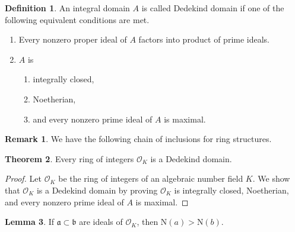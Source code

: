\documentclass[a4paper]{book}
\theoremstyle{definition}
\newtheorem{definition}{Definition}[]
\newtheorem{theorem}[definition]{Theorem}
\newtheorem{lemma}[definition]{Lemma}
\newtheorem*{remark}{Remark}
\begin{document}
\begin{defbox}
    \begin{definition}
        An integral domain \(A\) is called Dedekind domain if one of the following equivalent conditions are met.
        \begin{enumerate}
            \item Every nonzero proper ideal of \(A\) factors into product of prime ideals.
            \item \(A\) is
            \begin{enumerate}
                \item integrally closed,
                \item Noetherian,
                \item and every nonzero prime ideal of \(A\) is maximal.
            \end{enumerate}
        \end{enumerate}
    \end{definition}
\end{defbox}

\begin{rembox}
    \begin{remark}
        We have the following chain of inclusions for ring structures.
    \end{remark}
\end{rembox}

\begin{theorem}
    Every ring of integers \(\mathcal{O}_K\) is a Dedekind domain.
\end{theorem}
\begin{proof}
    Let \(\mathcal{O}_K\) be the ring of integers of an algebraic number field \(K\). We show that \(\mathcal{O}_K\) is a Dedekind domain by proving \(\mathcal{O}_K\) is integrally closed, Noetherian, and every nonzero prime ideal of \(A\) is maximal.
\end{proof}

\begin{thmbox}
    \begin{lemma}
        If \(\mathfrak{a} \subset \mathfrak{b}\) are ideals of \(\mathcal{O}_K\), then \(\mathrm{N}(a) > \mathrm{N}(b)\).
    \end{lemma}
\end{thmbox}
\end{document}
